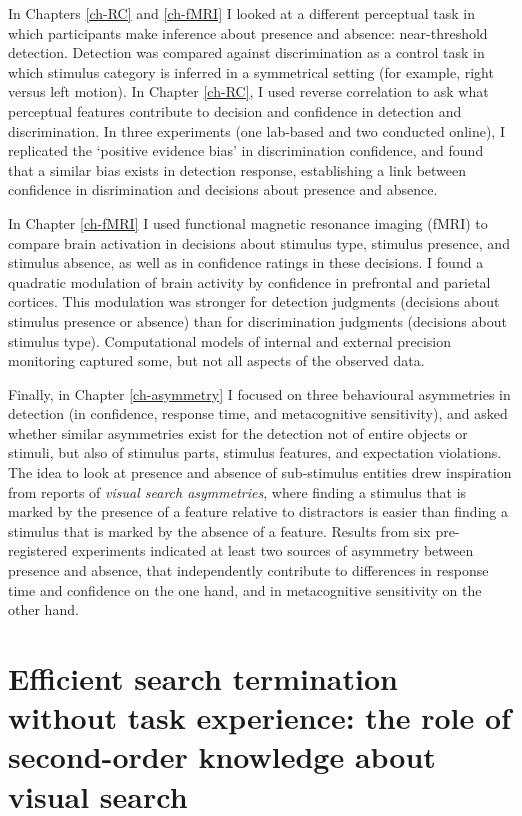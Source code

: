 \documentclass[12pt,twoside]{reedthesis}
\begin{document}
In Chapters \ref{ch-RC} and \ref{ch-fMRI} I looked at a different perceptual task in which participants make inference about presence and absence: near-threshold detection. Detection was compared against discrimination as a control task in which stimulus category is inferred in a symmetrical setting (for example, right versus left motion). In Chapter \ref{ch-RC}, I used reverse correlation to ask what perceptual features contribute to decision and confidence in detection and discrimination. In three experiments (one lab-based and two conducted online), I replicated the `positive evidence bias' in discrimination confidence, and found that a similar bias exists in detection response, establishing a link between confidence in disrimination and decisions about presence and absence.

In Chapter \ref{ch-fMRI} I used functional magnetic resonance imaging (fMRI) to compare brain activation in decisions about stimulus type, stimulus presence, and stimulus absence, as well as in confidence ratings in these decisions. I found a quadratic modulation of brain activity by confidence in prefrontal and parietal cortices. This modulation was stronger for detection judgments (decisions about stimulus presence or absence) than for discrimination judgments (decisions about stimulus type). Computational models of internal and external precision monitoring captured some, but not all aspects of the observed data.

Finally, in Chapter \ref{ch-asymmetry} I focused on three behavioural asymmetries in detection (in confidence, response time, and metacognitive sensitivity), and asked whether similar asymmetries exist for the detection not of entire objects or stimuli, but also of stimulus parts, stimulus features, and expectation violations. The idea to look at presence and absence of sub-stimulus entities drew inspiration from reports of \emph{visual search asymmetries}, where finding a stimulus that is marked by the presence of a feature relative to distractors is easier than finding a stimulus that is marked by the absence of a feature. Results from six pre-registered experiments indicated at least two sources of asymmetry between presence and absence, that independently contribute to differences in response time and confidence on the one hand, and in metacognitive sensitivity on the other hand.

\hypertarget{ch-termination}{%
\chapter{Efficient search termination without task experience: the role of second-order knowledge about visual search}\label{ch-termination}}
\end{document}
